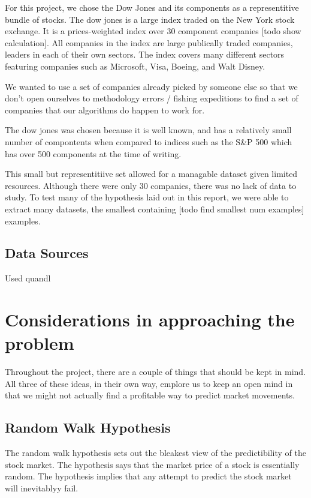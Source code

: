 \documentclass{report}
\begin{document}
For this project, we chose the Dow Jones and its components as a representitive bundle of stocks. The dow jones is a large index traded on the New York stock exchange. It is a prices-weighted index over 30 component companies [todo show calculation]. All companies in the index are large publically traded companies, leaders in each of their own sectors. The index covers many different sectors featuring companies such as Microsoft, Visa, Boeing, and Walt Disney.

We wanted to use a set of companies already picked by someone else so that we don't open ourselves to methodology errors / fishing expeditions to find a set of companies that our algorithms do happen to work for. 

The dow jones was chosen because it is well known, and has a relatively small number of compontents when compared to indices such as the S\&P 500 which has over 500 components at the time of writing. 

This small but representitiive set allowed for a managable dataset given limited resources. Although there were only 30 companies, there was no lack of data to study. To test many of the hypothesis laid out in this report, we were able to extract many datasets, the smallest containing [todo find smallest num examples] examples.

\section{Data Sources}

Used quandl

\chapter{Considerations in approaching the problem}

Throughout the project, there are a couple of things that should be kept in mind. All three of these ideas, in their own way, emplore us to keep an open mind in that we might not actually find a profitable way to predict market movements.

\section{Random Walk Hypothesis}

The random walk hypothesis sets out the bleakest view of the predictibility of the stock market. The hypothesis says that the market price of a stock is essentially random. The hypothesis implies that any attempt to predict the stock market will inevitablyy fail. 
\end{document}
